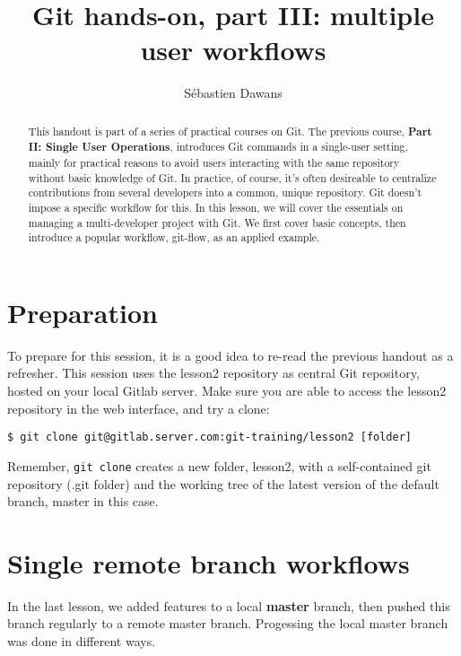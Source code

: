 \documentclass{../../common/tufte-latex/tufte-handout}
\title{Git hands-on, part III: multiple user workflows}
\author{S\'ebastien Dawans}
\begin{document}
\maketitle%

\begin{abstract}
\noindent
This handout is part of a series of practical courses on Git.
The previous course, \textbf{Part II: Single User Operations}, introduces Git commands in a single-user setting, mainly for practical reasons to avoid users interacting with the same repository without basic knowledge of Git.
In practice, of course, it's often desireable to centralize contributions from several developers into a common, unique repository.
Git doesn't impose a specific workflow for this. 
In this lesson, we will cover the essentials on managing a multi-developer project with Git.
We first cover basic concepts, then introduce a popular workflow, git-flow, as an applied example.
\end{abstract}

\section{Preparation}

To prepare for this session, it is a good idea to re-read the previous handout as a refresher.
This session uses the lesson2 repository as central Git repository, hosted on your local Gitlab server.
Make sure you are able to access the lesson2 repository in the web interface, and try a clone:

\begin{lstlisting}[style=BashInputStyle]
  $ git clone git@gitlab.server.com:git-training/lesson2 [folder]
\end{lstlisting}

Remember, \texttt{git clone} creates a new folder, lesson2, with a self-contained git repository (.git folder) and the working tree of the latest version of the default branch, master in this case.

\section{Single remote branch workflows}

In the last lesson, we added features to a local \textbf{master} branch, then pushed this branch regularly to a remote master branch.
Progessing the local master branch was done in different ways.
\end{document}
